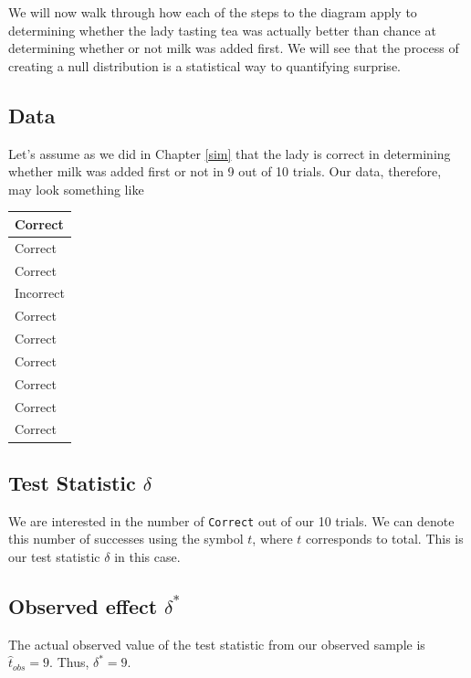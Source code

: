 \documentclass[]{tufte-book}
\begin{document}
We will now walk through how each of the steps to the diagram apply to
determining whether the lady tasting tea was actually better than chance
at determining whether or not milk was added first. We will see that the
process of creating a null distribution is a statistical way to
quantifying surprise.

\subsection{Data}\label{data}

Let's assume as we did in Chapter \ref{sim} that the lady is correct in
determining whether milk was added first or not in 9 out of 10 trials.
Our data, therefore, may look something like

\begin{tabular}{l}
\hline
Correct\\
\hline
Correct\\
\hline
Correct\\
\hline
Incorrect\\
\hline
Correct\\
\hline
Correct\\
\hline
Correct\\
\hline
Correct\\
\hline
Correct\\
\hline
Correct\\
\hline
\end{tabular}

\subsection{\texorpdfstring{Test Statistic
\(\delta\)}{Test Statistic \textbackslash{}delta}}\label{test-statistic-delta}

We are interested in the number of \texttt{Correct} out of our 10
trials. We can denote this number of successes using the symbol \(t\),
where \(t\) corresponds to total. This is our test statistic \(\delta\)
in this case.

\subsection{\texorpdfstring{Observed effect
\(\delta^*\)}{Observed effect \textbackslash{}delta\^{}*}}\label{observed-effect-delta}

The actual observed value of the test statistic from our observed sample
is \(\hat{t}_{obs} = 9\). Thus, \(\delta^* = 9\).
\end{document}
